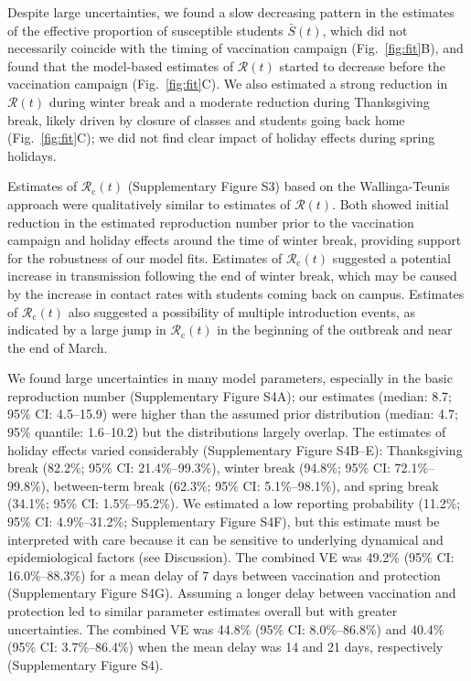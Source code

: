 \documentclass[12pt]{article}
\newcommand{\fref}[1]{Fig.~\ref{fig:#1}}
\begin{document}
Despite large uncertainties, we found a slow decreasing pattern in the estimates of the effective proportion of susceptible students $\bar{S}(t)$, which did not necessarily coincide with the timing of vaccination campaign (\fref{fit}B), and found that the model-based estimates of $\mathcal{R}(t)$ started to decrease before the vaccination campaign (\fref{fit}C).
We also estimated a strong reduction in $\mathcal{R}(t)$ during winter break and a moderate reduction during Thanksgiving break, likely driven by closure of classes and students going back home (\fref{fit}C);
we did not find clear impact of holiday effects during spring holidays.

Estimates of $\mathcal{R}_{\mathrm c}(t)$ (Supplementary Figure S3) based on the Wallinga-Teunis approach were qualitatively similar to estimates of $\mathcal{R}(t)$.
Both showed initial reduction in the estimated reproduction number prior to the vaccination campaign and holiday effects around the time of winter break, providing support for the robustness of our model fits.
Estimates of $\mathcal{R}_{\mathrm c}(t)$ suggested a potential increase in transmission following the end of winter break, which may be caused by the increase in contact rates with students coming back on campus.
Estimates of $\mathcal{R}_{\mathrm c}(t)$ also suggested a possibility of multiple introduction events, as indicated by a large jump in $\mathcal{R}_{\mathrm c}(t)$ in the beginning of the outbreak and near the end of March.

We found large uncertainties in many model parameters, especially in the basic reproduction number (Supplementary Figure S4A); our estimates (median: 8.7; 95\% CI: 4.5--15.9) were higher than the assumed prior distribution (median: 4.7; 95\% quantile: 1.6--10.2) but the distributions largely overlap.
The estimates of holiday effects varied considerably (Supplementary Figure S4B--E): Thanksgiving break (82.2\%; 95\% CI: 21.4\%--99.3\%), winter break (94.8\%; 95\% CI: 72.1\%--99.8\%), between-term break (62.3\%; 95\% CI: 5.1\%--98.1\%), and spring break (34.1\%; 95\% CI: 1.5\%--95.2\%). 
We estimated a low reporting probability (11.2\%; 95\% CI: 4.9\%--31.2\%; Supplementary Figure S4F), but this estimate must be interpreted with care because it can be sensitive to underlying dynamical and epidemiological factors (see Discussion).
The combined VE was 49.2\% (95\% CI: 16.0\%--88.3\%) for a mean delay of 7 days between vaccination and protection (Supplementary Figure S4G). 
Assuming a longer delay between vaccination and protection led to similar parameter estimates overall but with greater uncertainties.
The combined VE was 44.8\% (95\% CI: 8.0\%--86.8\%) and 40.4\% (95\% CI: 3.7\%--86.4\%) when the mean delay was 14 and 21 days, respectively (Supplementary Figure S4).
\end{document}
